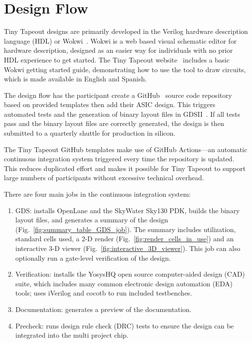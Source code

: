 \section{Design Flow}
\label{sec:design_flow}

Tiny Tapeout designs are primarily developed in the Verilog hardware description language (HDL) or Wokwi~\cite{wokwi}.
Wokwi is a web based visual schematic editor for hardware description, designed as an easier way for individuals with no prior HDL experience to get started.
The Tiny Tapeout website~\cite{tinytapeout} includes a basic Wokwi getting started guide, demonstrating how to use the tool to draw circuits, which is made available in English and Spanish.

The design flow has the participant create a GitHub~\cite{github} source code repository based on provided templates then add their ASIC design. This triggers automated tests and the generation of binary layout files in GDSII~\cite{gds}. If all tests pass and the binary layout files are correctly generated, the design is then submitted to a quarterly shuttle for production in silicon.

The Tiny Tapeout GitHub templates\cite{verilogtemplate} make use of GitHub Actions\cite{githubactions}---an automatic continuous integration system triggered every time the repository is updated. This reduces duplicated effort and makes it possible for Tiny Tapeout to support large numbers of participants without excessive technical overhead.

There are four main jobs in the continuous integration system:

\begin{enumerate}
	\item GDS: installs OpenLane\cite{openlane} and the SkyWater Sky130\cite{skywaterpdk} PDK, builds the binary layout files, and generates a summary of the design (Fig.~\ref{fig:summary_table_GDS_job}). The summary includes utilization, standard cells used, a 2-D render (Fig.~\ref{fig:render_cells_in_use}) and an interactive 3-D viewer (Fig.~\ref{fig:interactive_3D_viewer}).
This job can also optionally run a gate-level verification of the design.
	\item Verification: installs the YosysHQ open source computer-aided design (CAD) suite, which includes many common electronic design automation (EDA) tools; uses iVerilog\cite{iverilog} and cocotb\cite{cocotb} to run included testbenches.
	\item Documentation: generates a preview of the documentation.
	\item Precheck: runs design rule check (DRC) tests to ensure the design can be integrated into the multi project chip.
\end{enumerate}


